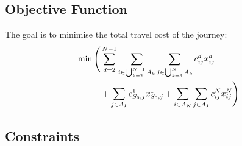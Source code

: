 \subsection*{Objective Function}
The goal is to minimise the total travel cost of the journey:
\begin{align}
\min \Bigg( &\sum_{d=2}^{N-1} \sum_{i \in \bigcup_{k=2}^{N-1} A_k} \sum_{j \in \bigcup_{k=3}^{N} A_k} c_{ij}^d x_{ij}^d \notag \\
           &+ \sum_{j \in A_1} c_{S_0,j}^1 x_{S_0,j}^1 + \sum_{i \in A_N} \sum_{j \in A_1} c_{ij}^N x_{ij}^N \Bigg)
\end{align}

\subsection*{Constraints}
